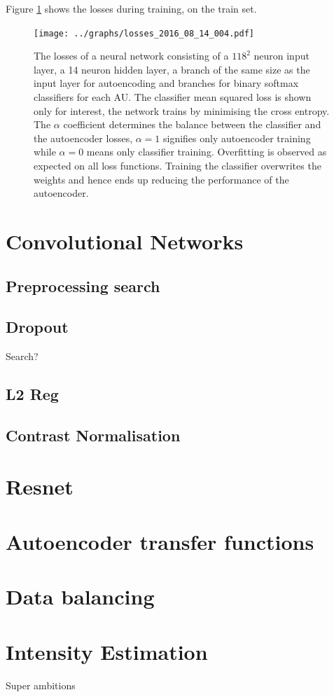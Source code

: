 \documentclass[11pt,twoside]{report}
\begin{document}
Figure \ref{fig:simple} shows the losses during training, on the train set.




\begin{figure}[!h]
\centering
\texttt{[image: ../graphs/losses\_2016\_08\_14\_004.pdf]}
\caption{The losses of a neural network consisting of a $118^2$ neuron input layer, a 14
neuron hidden layer, a branch of the same size as the input layer for autoencoding
and branches for binary softmax classifiers for each AU. The classifier mean
squared loss is shown only for interest, the network trains by minimising
the cross entropy. The $\alpha$ coefficient determines the balance between the
classifier and the autoencoder losses, $\alpha=1$ signifies only autoencoder training
while $\alpha=0$ means only classifier training. Overfitting is observed as expected
on all loss functions. Training the classifier
overwrites the weights and hence ends up reducing
the performance of the autoencoder.}
\label{fig:simple}
\end{figure}
\section{Convolutional Networks}
\subsection{Preprocessing search}
\subsection{Dropout}
Search?
\subsection{L2 Reg}
\subsection{Contrast Normalisation}
\section{Resnet}
\section{Autoencoder transfer functions}
\section{Data balancing}
\section{Intensity Estimation}
Super ambitions
\end{document}
